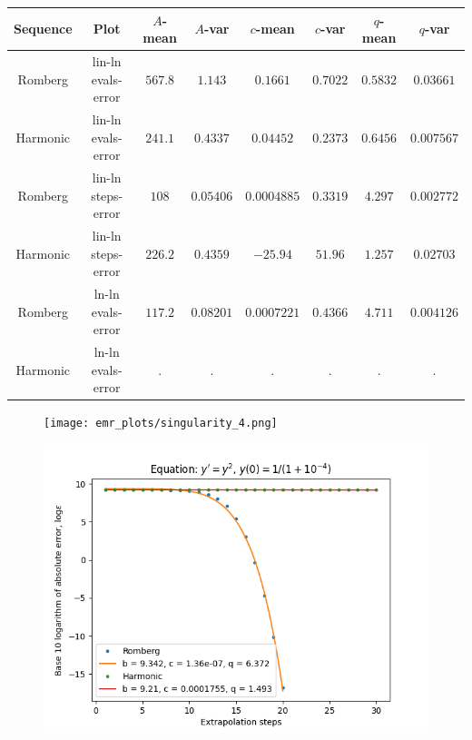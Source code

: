 \begin{table}[H]
    \centering
    \small
     \begin{tabular}{c|c||c|c|c|c|c|c}
Sequence & Plot & \(A\)-mean & \(A\)-var & \(c\)-mean & \(c\)-var & \(q\)-mean & \(q\)-var\\\hline
Romberg & lin-ln evals-error & \(567.8\) & \(1.143\) & \(0.1661\) & \(0.7022\) & \(0.5832\) & \(0.03661\) \\
Harmonic & lin-ln evals-error & \(241.1\) & \(0.4337\) & \(0.04452\) & \(0.2373\) & \(0.6456\) & \(0.007567\) \\
Romberg & lin-ln steps-error & \(108\) & \(0.05406\) & \(0.0004885\) & \(0.3319\) & \(4.297\) & \(0.002772\) \\
Harmonic & lin-ln steps-error & \(226.2\) & \(0.4359\) & \(-25.94\) & \(51.96\) & \(1.257\) & \(0.02703\) \\
Romberg & ln-ln evals-error & \(117.2\) & \(0.08201\) & \(0.0007221\) & \(0.4366\) & \(4.711\) & \(0.004126\) \\
Harmonic & ln-ln evals-error & . & . & . & . & . & . \\
    \end{tabular}
    \label{tab:my_label}
\end{table}

\begin{figure}[H]
\centering
\begin{minipage}{0.45\textwidth}
\centering
\texttt{[image: emr\_plots/singularity\_4.png]}
\end{minipage}
\begin{minipage}{0.45\textwidth}
\centering
\includegraphics[scale=0.45]{emr_plots/singularity_4_hp_steps.png}
\end{minipage}
\end{figure}

